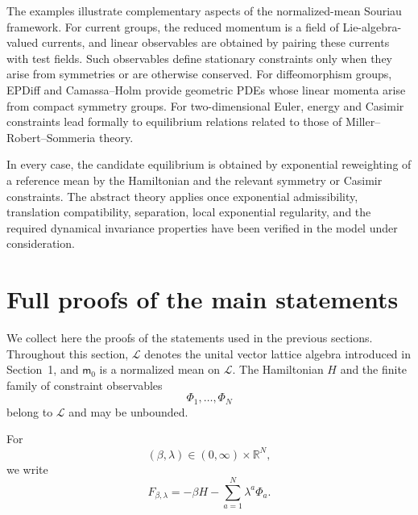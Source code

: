\documentclass[11pt,reqno]{amsart}
\begin{document}
The examples illustrate complementary aspects of the normalized-mean
Souriau framework. For current groups, the reduced momentum is a field
of Lie-algebra-valued currents, and linear observables are obtained by
pairing these currents with test fields. Such observables define
stationary constraints only when they arise from symmetries or are
otherwise conserved. For diffeomorphism groups, EPDiff and
Camassa--Holm provide geometric PDEs whose linear momenta arise from
compact symmetry groups. For two-dimensional Euler, energy and Casimir
constraints lead formally to equilibrium relations related to those of
Miller--Robert--Sommeria theory.

In every case, the candidate equilibrium is obtained by exponential
reweighting of a reference mean by the Hamiltonian and the relevant
symmetry or Casimir constraints. The abstract theory applies once
exponential admissibility, translation compatibility, separation,
local exponential regularity, and the required dynamical invariance
properties have been verified in the model under consideration.

\section{Full proofs of the main statements}
\label{sec:full-proofs}

We collect here the proofs of the statements used in the previous
sections. Throughout this section, $\mathcal L$ denotes the unital vector
lattice algebra introduced in Section~1, and $\mathsf m_0$ is a normalized
mean on $\mathcal L$. The Hamiltonian $H$ and the finite family of
constraint observables
\[
\Phi_1,\ldots,\Phi_N
\]
belong to $\mathcal L$ and may be unbounded.

For
\[
(\beta,\lambda)\in(0,\infty)\times\mathbb R^N,
\]
we write
\[
F_{\beta,\lambda}
=
-\beta H-\sum_{a=1}^{N}\lambda^a\Phi_a.
\]
\end{document}
